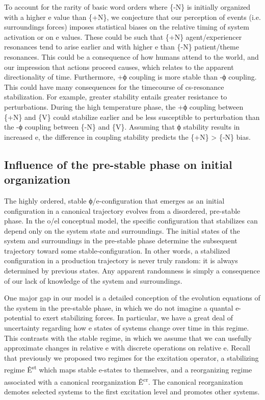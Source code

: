   To account for the rarity of basic word orders where \{-N\} is initially organized with a higher e value than \{+N\}, we conjecture that our perception of events (i.e. surroundings forces) imposes statistical biases on the relative timing of system activation or on e values. These could be such that \{+N\} agent/experiencer resonances tend to arise earlier and with higher e than \{-N\} patient/theme resonances. This could be a consequence of how humans attend to the world, and our impression that actions proceed causes, which relates to the apparent directionality of time. Furthermore, +ϕ coupling is more stable than -ϕ coupling. This could have many consequences for the timecourse of cs-resonance stabilization. For example, greater stability entails greater resistance to perturbations. During the high temperature phase, the +ϕ coupling between \{+N\} and \{V\} could stabilize earlier and be less susceptible to perturbation than the -ϕ coupling between \{-N\} and \{V\}. Assuming that ϕ stability results in increased e, the difference in coupling stability predicts the \{+N\} > \{-N\} bias.

\subsection{Influence of the pre-stable phase on initial organization}

The highly ordered, stable ϕ/e-configuration that emerges as an initial configuration in a canonical trajectory evolves from a disordered, pre-stable phase. In the o/el conceptual model, the specific configuration that stabilizes can depend only on the system state and surroundings. The initial states of the system and surroundings in the pre-stable phase determine the subsequent trajectory toward some stable-configuration. In other words, a stabilized configuration in a production trajectory is never truly random: it is always determined by previous states. Any apparent randomness is simply a consequence of our lack of knowledge of the system and surroundings.

  One major gap in our model is a detailed conception of the evolution equations of the system in the pre-stable phase, in which we do not imagine a quantal e-potential to exert stabilizing forces. In particular, we have a great deal of uncertainty regarding how e states of systems change over time in this regime. This contrasts with the stable regime, in which we assume that we can usefully approximate changes in relative e with discrete operations on relative e. Recall that previously we proposed two regimes for the excitation operator, a stabilizing regime Ê\textsuperscript{st} which maps stable e-states to themselves, and a reorganizing regime associated with a canonical reorganization Ê\textsuperscript{cr}. The canonical reorganization demotes selected systems to the first excitation level and promotes other systems. 

